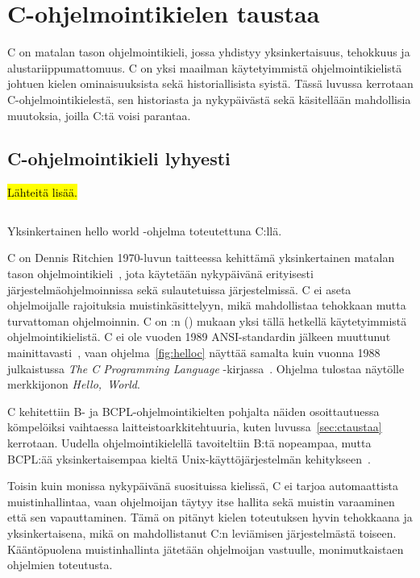 \section{C-ohjelmointikielen taustaa}

C on matalan tason ohjelmointikieli, jossa yhdistyy yksinkertaisuus, tehokkuus
ja alustariippumattomuus. C on yksi maailman käytetyimmistä
ohjelmointikielistä~\citep{tiobe} johtuen kielen ominaisuuksista sekä
historiallisista syistä. Tässä luvussa kerrotaan C-ohjelmointikielestä, sen
historiasta ja nykypäivästä sekä käsitellään mahdollisia muutoksia, joilla C:tä
voisi parantaa.

\subsection{C-ohjelmointikieli lyhyesti}
\label{sec:clyhyesti}


\hl{Lähteitä lisää.}

\begin{listing}[ht!]
    \inputminted{C}{koodi/hello.c}
    \caption{Yksinkertainen hello world -ohjelma toteutettuna C:llä.}
    \label{fig:helloc}
\end{listing}

C on Dennis Ritchien 1970-luvun taitteessa kehittämä yksinkertainen matalan
tason ohjelmointikieli~\citep{chistory}, jota käytetään nykypäivänä erityisesti
järjestelmäohjelmoinnissa sekä sulautetuissa järjestelmissä. C ei aseta
ohjelmoijalle rajoituksia muistinkäsittelyyn, mikä mahdollistaa tehokkaan mutta
turvattoman ohjelmoinnin. C on \citeauthor{tiobe}:n (\citeyear{tiobe}) mukaan
yksi tällä hetkellä käytetyimmistä ohjelmointikielistä. C ei ole vuoden 1989
ANSI-standardin jälkeen muuttunut mainittavasti~\citep{chistory, C18}, vaan
ohjelma~\ref{fig:helloc} näyttää samalta kuin vuonna 1988 julkaistussa
\emph{The C Programming Language} -kirjassa~\citep{krsecond}. Ohjelma tulostaa
näytölle merkkijonon \emph{Hello,~World}.

C kehitettiin B- ja BCPL-ohjelmointikielten pohjalta näiden osoittautuessa
kömpelöiksi vaihtaessa laitteistoarkkitehtuuria, kuten
luvussa~\ref{sec:ctaustaa} kerrotaan. Uudella ohjelmointikielellä tavoiteltiin
B:tä nopeampaa, mutta BCPL:ää yksinkertaisempaa kieltä Unix-käyttöjärjestelmän
kehitykseen~\citep{chistory}.

Toisin kuin monissa nykypäivänä suosituissa kielissä, C ei tarjoa automaattista
muistinhallintaa, vaan ohjelmoijan täytyy itse hallita sekä muistin varaaminen
että sen vapauttaminen. Tämä on pitänyt kielen toteutuksen hyvin tehokkaana ja
yksinkertaisena, mikä on mahdollistanut C:n leviämisen järjestelmästä toiseen.
Kääntöpuolena muistinhallinta jätetään ohjelmoijan vastuulle, monimutkaistaen
ohjelmien toteutusta.

